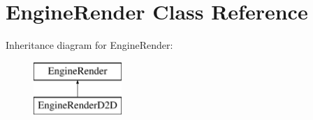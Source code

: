 \hypertarget{class_engine_render}{\section{Engine\-Render Class Reference}
\label{class_engine_render}
}
Inheritance diagram for Engine\-Render\-:\begin{figure}[H]
\begin{center}
\leavevmode
\includegraphics[height=2.000000cm]{class_engine_render}
\end{center}
\end{figure}
